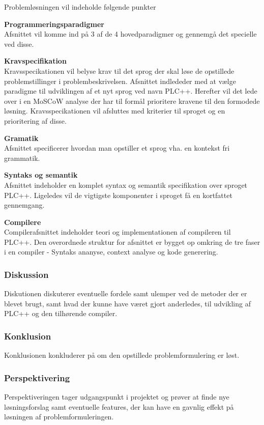 Problemløsningen vil indeholde følgende punkter
\begin{itemize_small}
    \item \textbf{Programmeringsparadigmer}\\
    Afsnittet vil komme ind på 3 af de 4 hovedparadigmer og gennemgå det specielle ved disse.
    \item \textbf{Kravspecifikation}\\
    Kravsspecikationen vil belyse krav til det sprog der skal løse de opstillede problemstillinger i problembeskrivelsen. Afsnittet indlededer med at vælge paradigme til udviklingen af et nyt sprog ved navn PLC++. Herefter vil det lede over i en MoSCoW analyse der har til formål prioritere kravene til den formodede løsning. Kravsspecikationen vil afsluttes med kriterier til sproget og en prioritering af disse.
    \item \textbf{Gramatik}\\ Afsnittet specificerer hvordan man opstiller et sprog vha. en kontekst fri grammatik.
    \item \textbf{Syntaks og semantik}\\
    Afsnittet indeholder en komplet syntax og semantik specifikation over sproget PLC++. Ligeledes vil de vigtigste komponenter i sproget få en kortfattet gennemgang.
    \item \textbf{Compilere}\\
    Compilerafsnittet indeholder teori og implementationen af compileren til PLC++. Den overordnede struktur for afsnittet er bygget op omkring de tre faser i en compiler - Syntaks ananyse, context analyse og kode generering.
\end{itemize_small}

\subsubsection*{Diskussion}
Diskutionen diskuterer eventuelle fordele samt ulemper ved de metoder der er blevet brugt, samt hvad der kunne have været gjort anderledes, til udvikling af PLC++ og den tilhørende compiler. 
\subsubsection*{Konklusion}
Konklusionen konkluderer på om den opstillede problemformulering er løst.

\subsubsection*{Perspektivering}
Perspektiveringen tager udgangspunkt i projektet og prøver at finde nye løsningsforslag samt eventuelle features, der kan have en gavnlig effekt på løsningen af problemformuleringen.

